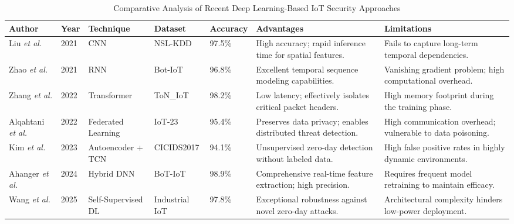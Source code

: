 \documentclass[conference]{IEEEtran}
\begin{document}
\begin{table}[htbp]
\centering
\caption{Comparative Analysis of Recent Deep Learning-Based IoT Security Approaches}
\label{tab:comparison}
\begin{tabular}{@{}llp{2cm}lp{1.2cm}p{3.5cm}p{3.5cm}@{}}
\toprule
\textbf{Author} & \textbf{Year} & \textbf{Technique} & \textbf{Dataset} & \textbf{Accuracy} & \textbf{Advantages} & \textbf{Limitations} \\ \midrule
Liu \textit{et al.} \cite{liu2021novel} & 2021 & CNN & NSL-KDD & 97.5\% & High accuracy; rapid inference time for spatial features. & Fails to capture long-term temporal dependencies. \\
Zhao \textit{et al.} \cite{zhao2021} & 2021 & RNN & Bot-IoT & 96.8\% & Excellent temporal sequence modeling capabilities. & Vanishing gradient problem; high computational overhead. \\
Zhang \textit{et al.} \cite{zhang2022} & 2022 & Transformer & ToN\_IoT & 98.2\% & Low latency; effectively isolates critical packet headers. & High memory footprint during the training phase. \\
Alqahtani \textit{et al.} \cite{alqahtani2022} & 2022 & Federated Learning & IoT-23 & 95.4\% & Preserves data privacy; enables distributed threat detection. & High communication overhead; vulnerable to data poisoning. \\
Kim \textit{et al.} \cite{kim2023} & 2023 & Autoencoder + TCN & CICIDS2017 & 94.1\% & Unsupervised zero-day detection without labeled data. & High false positive rates in highly dynamic environments. \\
Ahanger \textit{et al.} \cite{ahanger2024} & 2024 & Hybrid DNN & BoT-IoT & 98.9\% & Comprehensive real-time feature extraction; high precision. & Requires frequent model retraining to maintain efficacy. \\
Wang \textit{et al.} \cite{wang2025} & 2025 & Self-Supervised DL & Industrial IoT & 97.8\% & Exceptional robustness against novel zero-day attacks. & Architectural complexity hinders low-power deployment. \\ \bottomrule
\end{tabular}
\end{table}
\end{document}
